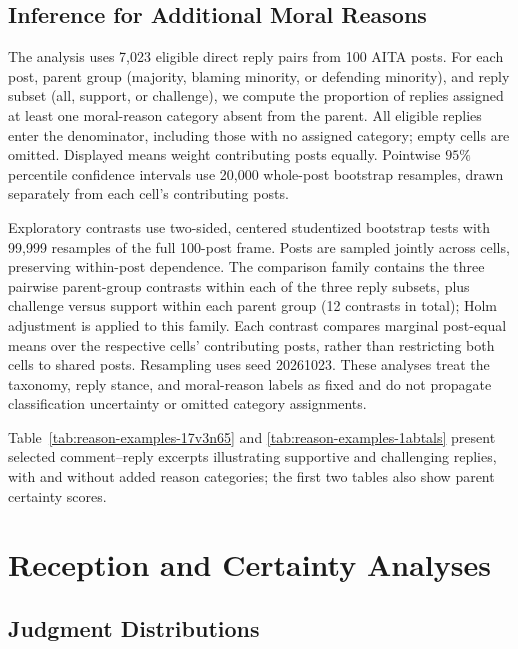 \subsection{Inference for Additional Moral Reasons}
\label{sec:supp-moral-reason-inference}

The analysis uses 7,023 eligible direct reply pairs from 100 AITA posts.
For each post, parent group (majority, blaming minority, or defending
minority), and reply subset (all, support, or challenge), we compute the
proportion of replies assigned at least one moral-reason category absent
from the parent. All eligible replies enter the denominator, including
those with no assigned category; empty cells are omitted. Displayed means
weight contributing posts equally. Pointwise $95\%$ percentile confidence
intervals use 20,000 whole-post bootstrap resamples, drawn separately
from each cell's contributing posts.

Exploratory contrasts use two-sided, centered studentized bootstrap tests
with 99,999 resamples of the full 100-post frame. Posts are sampled jointly
across cells, preserving within-post dependence. The comparison family
contains the three pairwise parent-group contrasts within each of the
three reply subsets, plus challenge versus support within each parent
group (12 contrasts in total); Holm adjustment is applied to this family.
Each contrast compares marginal post-equal means over the respective
cells' contributing posts, rather than restricting both cells to shared
posts. Resampling uses seed 20261023. These analyses treat the taxonomy,
reply stance, and moral-reason labels as fixed and do not propagate
classification uncertainty or omitted category assignments.


Table~\ref{tab:reason-examples-17v3n65} and \ref{tab:reason-examples-1abtals} present selected comment--reply excerpts illustrating supportive and challenging replies, with and without added reason categories; the first two tables also show parent certainty scores.



\section{Reception and Certainty Analyses}
\label{sec:supp-analyses}

\subsection{Judgment Distributions}
\label{sec:supp-verdict-distribution}

